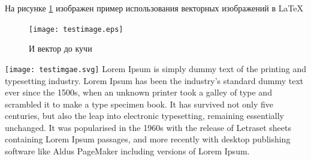 На рисунке \ref{f:3} изображен пример использования векторных изображений в LaTeX
\begin{figure}[h!]
\begin{center}
\texttt{[image: testimage.eps]}
\end{center} 
\caption{И вектор до кучи}
\label{f:3}
\end{figure}
\texttt{[image: testimgae.svg]}
Lorem Ipsum is simply dummy text of the printing and typesetting industry. Lorem Ipsum has been the industry's standard dummy text ever since the 1500s, when an unknown printer took a galley of type and scrambled it to make a type specimen book. It has survived not only five centuries, but also the leap into electronic typesetting, remaining essentially unchanged. It was popularised in the 1960s with the release of Letraset sheets containing Lorem Ipsum passages, and more recently with desktop publishing software like Aldus PageMaker including versions of Lorem Ipsum.



